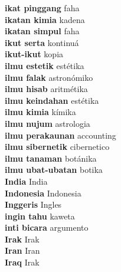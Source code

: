 \textbf{ ikat pinggang  } faha \\
\textbf{ ikatan kimia  } kadena \\
\textbf{ ikatan simpul  } faha \\
\textbf{ ikut serta  } kontinuá \\
\textbf{ ikut-ikut  } kopia \\
\textbf{ ilmu estetik  } estétika \\
\textbf{ ilmu falak  } astronómiko \\
\textbf{ ilmu hisab  } aritmétika \\
\textbf{ ilmu keindahan  } estétika \\
\textbf{ ilmu kimia  } kímika \\
\textbf{ ilmu nujum  } astrologia \\
\textbf{ ilmu perakaunan  } accounting \\
\textbf{ ilmu sibernetik  } cibernetico \\
\textbf{ ilmu tanaman  } botánika \\
\textbf{ ilmu ubat-ubatan  } botika \\
\textbf{ India  } India \\
\textbf{ Indonesia  } Indonesia \\
\textbf{ Inggeris  } Ingles \\
\textbf{ ingin tahu  } kaweta \\
\textbf{ inti bicara  } argumento \\
\textbf{ Irak  } Irak \\
\textbf{ Iran  } Iran \\
\textbf{ Iraq  } Irak \\
